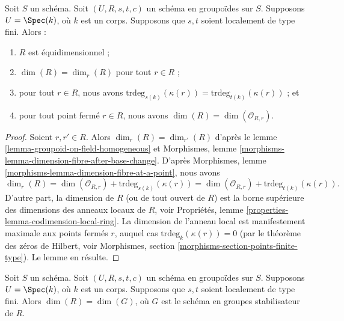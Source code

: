 \begin{lemma}
\label{lemma-groupoid-on-field-locally-finite-type-dimension}
Soit $S$ un schéma. Soit $(U, R, s, t, c)$ un schéma en groupoïdes
sur $S$. Supposons $U = \Spec(k)$, où $k$ est un corps.
Supposons que $s, t$ soient localement de type fini.
Alors :
\begin{enumerate}
\item $R$ est équidimensionnel ;
\item $\dim(R) = \dim_r(R)$ pour tout $r \in R$ ;
\item pour tout $r \in R$, nous avons
$\text{trdeg}_{s(k)}(\kappa(r)) = \text{trdeg}_{t(k)}(\kappa(r))$ ; et
\item pour tout point fermé $r \in R$, nous avons
$\dim(R) = \dim(\mathcal{O}_{R, r})$.
\end{enumerate}
\end{lemma}

\begin{proof}
Soient $r, r' \in R$.
Alors $\dim_r(R) = \dim_{r'}(R)$ d'après le
lemme \ref{lemma-groupoid-on-field-homogeneous}
et
Morphismes, lemme \ref{morphisms-lemma-dimension-fibre-after-base-change}.
D'après
Morphismes, lemme \ref{morphisms-lemma-dimension-fibre-at-a-point},
nous avons
$$
\dim_r(R) =
\dim(\mathcal{O}_{R, r}) + \text{trdeg}_{s(k)}(\kappa(r)) =
\dim(\mathcal{O}_{R, r}) + \text{trdeg}_{t(k)}(\kappa(r)).
$$
D'autre part, la dimension de $R$ (ou de tout ouvert de $R$)
est la borne supérieure des dimensions des anneaux locaux de $R$, voir
Propriétés, lemme \ref{properties-lemma-codimension-local-ring}.
La dimension de l'anneau local est manifestement maximale aux points fermés $r$, auquel cas
$\text{trdeg}_k(\kappa(r)) = 0$ (par le théorème des zéros de Hilbert, voir
Morphismes, section \ref{morphisms-section-points-finite-type}).
Le lemme en résulte.
\end{proof}

\begin{lemma}
\label{lemma-groupoid-on-field-dimension-equal-stabilizer}
Soit $S$ un schéma. Soit $(U, R, s, t, c)$ un schéma en groupoïdes
sur $S$. Supposons $U = \Spec(k)$, où $k$ est un corps.
Supposons que $s, t$ soient localement de type fini.
Alors $\dim(R) = \dim(G)$, où $G$ est le schéma en groupes stabilisateur de $R$.
\end{lemma}

